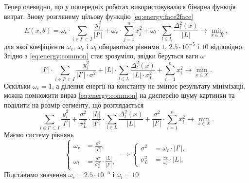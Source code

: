 Тепер очевидно,
що у попередніх роботах використовувалася бінарна функція витрат.
Знову розглянему цільову функцію \eqref{eq:energy:face2face}
\begin{equation*}
  E\left( x, \theta \right)
  = \omega_c \cdot \sum_{i \in I' \subset I} \frac{y_i^2}{\left| I' \right|}
  + \omega_r \cdot \sum_{j = 1}^{n} x_j^2
  + \omega_l \cdot \sum_{l \in L} \frac{\Delta_l^2\left( x \right)}
                                       {\left| L \right|}
  \to \min\limits_{x \in X},
\end{equation*}
для якої коефіцієнти $\omega_c$, $\omega_r$ і $\omega_l$
обираються рівними $1$, $2.5 \cdot 10^{-5}$ і $10$ відповідно.
Згідно з \eqref{eq:energy:common} стає зрозуміло,
звідки беруться ваги $\omega$
\begin{equation*}
  \left| I' \right| \cdot
    \sum_{i \in I' \subset I} \frac{y_i^2}{\left| I' \right| \cdot \sigma^2}
  + \left| L \right| \cdot
    \sum_{l \in L} \frac{\Delta_l^2\left( x \right)}
                        {\left| L \right| \cdot \sigma_L^2}
  + \sum_{i = 1}^n x_i^2
  \to \min\limits_{x \in X}.
\end{equation*}
Оскільки $\omega_c = 1$,
а ділення енергії на константу не змінює результату мінімізації,
можна помножити вираз \eqref{eq:energy:common} на дисперсію шуму картинки
та поділити на розмір сегменту, що розглядається
\begin{equation*}
  \sum_{i \in I' \subset I} \frac{y_i^2}{\left| I' \right|}
  + \frac{\sigma^2}{\sigma_L^2} \cdot \frac{\left| L \right|}{\left| I' \right|}
    \cdot \sum_{l \in L} \frac{\Delta_l^2\left( x \right)}{\left| L \right|}
  + \frac{\sigma^2}{\left| I' \right|} \cdot \sum_{i = 1}^n x_i^2
  \to \min\limits_{x \in X}.
\end{equation*}
Маємо систему рівнянь
\begin{equation*}
  \begin{cases}
    \omega_r &= \frac{\sigma^2}{\left| I' \right|}, \\
    \omega_l &= \frac{\sigma^2}{\sigma_L^2}
                \cdot \frac{\left| L \right|}{\left| I' \right|},
  \end{cases}
  \implies
  \begin{cases}
    \sigma^2 &= \omega_r \cdot \left| I' \right|, \\
    \sigma_L^2 &= \frac{\omega_r}{\omega_l} \cdot \left| L \right|.
  \end{cases}
\end{equation*}
Підставимо значення $\omega_r = 2.5 \cdot 10^{-5}$ і $\omega_l = 10$
